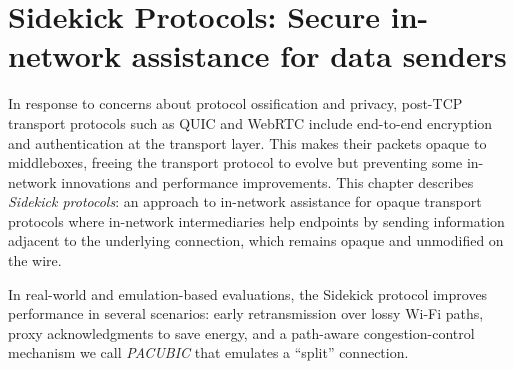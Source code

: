 \chapter[Sidekick Protocols]{Sidekick Protocols: Secure in-network assistance for data senders}
\label{sec:sidekick}

In response to concerns about protocol ossification and privacy, post-TCP
transport protocols such as QUIC and Web\-RTC include end-to-end encryption and
authentication at the transport layer. This makes their packets opaque to
middleboxes, freeing the transport protocol to evolve but preventing some
in-network innovations and performance improvements. This chapter describes
\emph{Sidekick protocols}: an approach to in-network assistance for opaque
transport protocols where in-network intermediaries help endpoints by sending
information adjacent to the underlying connection, which remains opaque and
unmodified on the wire.

In real-world and emulation-based evaluations, the Sidekick protocol improves
performance in several scenarios: early retransmission over lossy Wi-Fi paths,
proxy acknowledgments to save energy, and a path-aware congestion-control
mechanism we call \emph{PACUBIC} that emulates a ``split'' connection.







